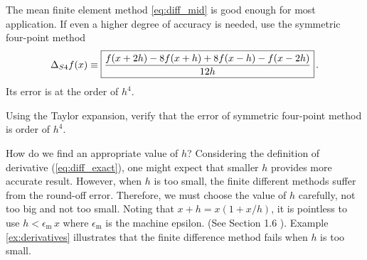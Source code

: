 The mean finite element method \eqref{eq:diff_mid} is good enough for most application.
If even a higher degree of accuracy is needed, use the symmetric four-point method\cite{Zwillinger2012}
\begin{equation}
\Delta_{S4} f(x) \equiv \fbox{$\displaystyle\frac{f(x+2h) - 8 f(x+h) + 8 f(x-h) - f(x - 2h)}{12 h}$}\, .
\end{equation}
Its error is at the order of $h^4$. 

\vspace{18px}
\noindent
\exercise
Using the Taylor expansion, verify that the error of symmetric four-point method is order of $h^4$.
\vspace{18px}

How do we find an appropriate value of $h$?
Considering the definition of derivative (\ref{eq:diff_exact}), one might expect that smaller $h$ provides more accurate result. However, when $h$ is too small, the finite different methods suffer from the round-off error.  Therefore, we must choose the value of $h$  carefully, not too big and not too small. Noting that $x+h = x (1+x/h)$, it is pointless to use $h < \epsilon_\text{m}\, x$ where $\epsilon_\text{m}$ is the machine epsilon. (See Section 1.6
). Example \ref{ex:derivatives} illustrates that the finite difference method fails when $h$ is too small. 


